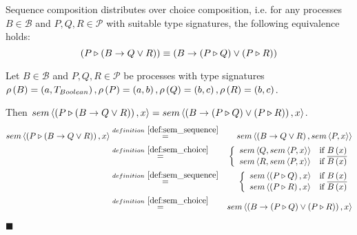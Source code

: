 \begin{theorem}
\label{thm:distributivity_sequence_choice}
Sequence composition distributes over choice composition, i.e. for any processes $B \in \mathcal{B}$ and $P, Q, R \in \mathcal{P}$ with suitable type signatures, the following equivalence holds:
\begin{equation*}
  \left( P \triangleright \left( B \to Q \vee R \right) \right) \equiv \left( B \to \left( P \triangleright Q \right) \vee \left( P \triangleright R \right) \right)
\end{equation*}
\end{theorem}

\begin{myproof}
Let $B \in \mathcal{B}$ and $P, Q, R \in \mathcal{P}$ be processes with type signatures $\rho \left( B \right) = \left( a, T_{Boolean} \right), \rho \left( P \right) = \left( a, b \right), \rho \left( Q \right) = \left( b, c \right), \rho \left( R \right) = \left( b, c \right)$. 

Then $sem \left\langle \left( P \triangleright \left( B \to Q \vee R \right) \right), x \right\rangle = sem \left\langle \left( B \to \left( P \triangleright Q \right) \vee \left( P \triangleright R \right) \right), x \right\rangle$.
\begin{eqnarray*}
  \sem{\sequence{P}{\choice{B}{Q}{R}}}{x} & \overset{\defref{def:sem_sequence}}{=} & \sem{\choice{B}{Q}{R}}{\sem{P}{x}} \\
                                          & \overset{\defref{def:sem_choice}}{=}   & \left\{\begin{array}{ll}
                                                                                              \sem{Q}{\sem{P}{x}} & \text{if } B \left( x \right) \\
                                                                                              \sem{R}{\sem{P}{x}} & \text{if } \overline{B \left( x \right)}
                                                                                            \end{array}
                                                                                     \right. \\
                                          & \overset{\defref{def:sem_sequence}}{=} & \left\{\begin{array}{ll}
                                                                                              \sem{\sequence{P}{Q}}{x} & \text{if } B \left( x \right) \\
                                                                                              \sem{\sequence{P}{R}}{x} & \text{if } \overline{B \left( x \right)}
                                                                                            \end{array}
                                                                                     \right. \\
                                          & \overset{\defref{def:sem_choice}}{=}   & \sem{\choice{B}{\sequence{P}{Q}}{\sequence{P}{R}}}{x}
\end{eqnarray*}


\hfill$\blacksquare$
\end{myproof}

